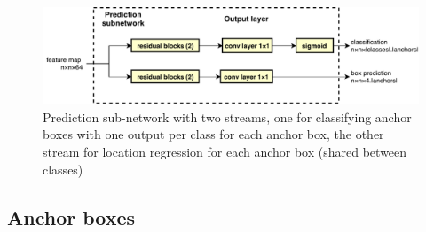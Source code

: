 \begin{figure}
  \centering
  \includegraphics[width=1.0\linewidth]{figures/annotation/prediction_subnet.pdf}
  \caption{Prediction sub-network with two streams, one for classifying anchor boxes with one output per class for each anchor box, the other stream for location regression for each anchor box (shared between classes)}    
  \label{fig:prediction_subnet}  
\end{figure}




\subsection{Anchor boxes}


